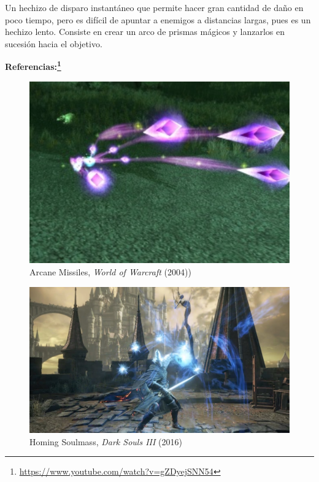 \documentclass[12pt]{report}
\begin{document}
Un hechizo de disparo instantáneo que permite hacer gran cantidad de daño en poco tiempo, pero es difícil de apuntar a enemigos a distancias largas, pues es un hechizo lento. Consiste en crear un arco de prismas mágicos y lanzarlos en sucesión hacia el objetivo.

\textbf{Referencias:\footnote{\url{https://www.youtube.com/watch?v=gZDyejSNN54}}}
 
\begin{figure}[H]
    \centering
    \includegraphics[width=1\textwidth]{arcane_missiles_wow}
	\captionsetup{labelformat=empty}
    \caption{Arcane Missiles, \textit{World of Warcraft} (2004))}
\end{figure}

\begin{figure}[H]
    \centering
    \includegraphics[width=1\textwidth]{homing_soulmass_dark_souls}
	\captionsetup{labelformat=empty}
    \caption{Homing Soulmass, \textit{Dark Souls III} (2016)}
\end{figure}
\end{document}
